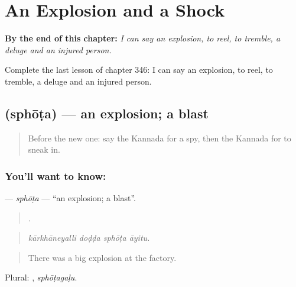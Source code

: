 
\chapter{An Explosion and a Shock}
\label{ch:ka-an-explosion-and-a-shock}

\begin{chapteropening}
\textbf{By the end of this chapter:} \emph{I can say an explosion, to reel, to tremble, a deluge and an injured person.}

Complete the last lesson of chapter 346: I can say an explosion, to reel, to tremble, a deluge and an injured person.
\end{chapteropening}

\section[\texorpdfstring{\kn{ಸ್ಫೋಟ} (sphōṭa)}{ಸ್ಫೋಟ (sphōṭa)}]{ (sphōṭa) — an explosion; a blast}

\label{lesson:KA-C346-sphota}



\begin{quote}
Before the new one: say the Kannada for a spy, then the Kannada for to sneak in.
\end{quote}

\subsection*{You'll want to know: }
\textbf{} — \emph{sphōṭa} — \textquotedblleft{}an explosion; a blast\textquotedblright{}.

\begin{quote}
   .
\end{quote}

\begin{quote}
\emph{kārkhāneyalli doḍḍa sphōṭa āyitu.}
\end{quote}

\begin{quote}
There was a big explosion at the factory.
\end{quote}

Plural: , \emph{sphōṭagaḷu}.

